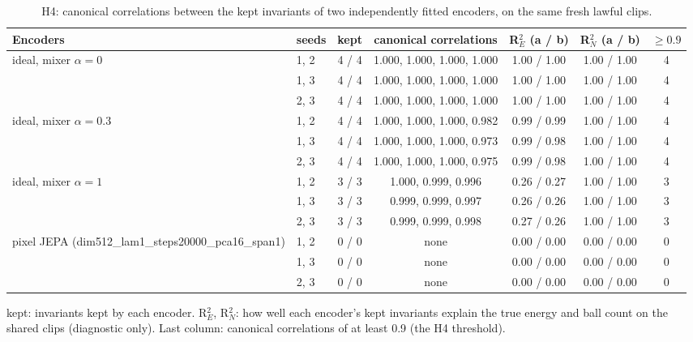 \begin{table}[t]\centering\small
\caption{H4: canonical correlations between the kept invariants of two independently fitted encoders, on the same fresh lawful clips.}\label{tab:agreement}
\begin{tabular}{llccccc}\toprule
Encoders & seeds & kept & canonical correlations & R$^2_E$ (a / b) & R$^2_N$ (a / b) & $\ge 0.9$\\\midrule
ideal, mixer $\alpha=0$ & 1, 2 & 4 / 4 & 1.000, 1.000, 1.000, 1.000 & 1.00 / 1.00 & 1.00 / 1.00 & 4\\
 & 1, 3 & 4 / 4 & 1.000, 1.000, 1.000, 1.000 & 1.00 / 1.00 & 1.00 / 1.00 & 4\\
 & 2, 3 & 4 / 4 & 1.000, 1.000, 1.000, 1.000 & 1.00 / 1.00 & 1.00 / 1.00 & 4\\
\midrule
ideal, mixer $\alpha=0.3$ & 1, 2 & 4 / 4 & 1.000, 1.000, 1.000, 0.982 & 0.99 / 0.99 & 1.00 / 1.00 & 4\\
 & 1, 3 & 4 / 4 & 1.000, 1.000, 1.000, 0.973 & 0.99 / 0.98 & 1.00 / 1.00 & 4\\
 & 2, 3 & 4 / 4 & 1.000, 1.000, 1.000, 0.975 & 0.99 / 0.98 & 1.00 / 1.00 & 4\\
\midrule
ideal, mixer $\alpha=1$ & 1, 2 & 3 / 3 & 1.000, 0.999, 0.996 & 0.26 / 0.27 & 1.00 / 1.00 & 3\\
 & 1, 3 & 3 / 3 & 0.999, 0.999, 0.997 & 0.26 / 0.26 & 1.00 / 1.00 & 3\\
 & 2, 3 & 3 / 3 & 0.999, 0.999, 0.998 & 0.27 / 0.26 & 1.00 / 1.00 & 3\\
\midrule
pixel JEPA (dim512\_lam1\_steps20000\_pca16\_span1) & 1, 2 & 0 / 0 & none & 0.00 / 0.00 & 0.00 / 0.00 & 0\\
 & 1, 3 & 0 / 0 & none & 0.00 / 0.00 & 0.00 / 0.00 & 0\\
 & 2, 3 & 0 / 0 & none & 0.00 / 0.00 & 0.00 / 0.00 & 0\\
\bottomrule
\end{tabular}
\par\smallskip\footnotesize kept: invariants kept by each encoder. R$^2_E$, R$^2_N$: how well each encoder's kept invariants explain the true energy and ball count on the shared clips (diagnostic only). Last column: canonical correlations of at least 0.9 (the H4 threshold).
\end{table}
